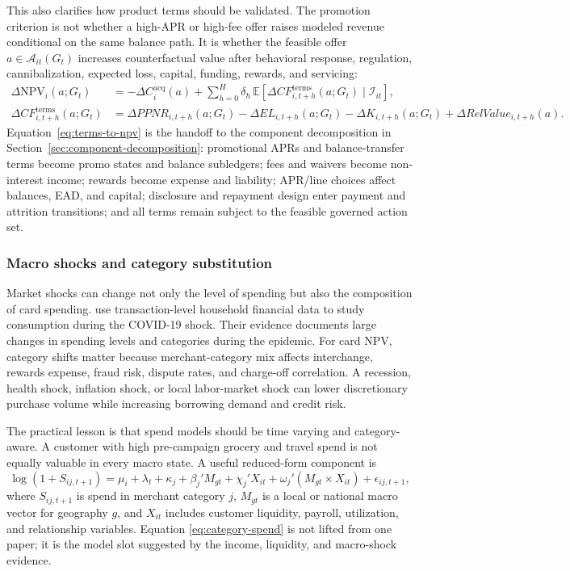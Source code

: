 \documentclass[11pt]{article}
\newcommand{\E}{\mathbb{E}}
\newcommand{\NPV}{\mathrm{NPV}}
\newcommand{\1}{\mathbf{1}}
\begin{document}
This also clarifies how product terms should be validated. The promotion
criterion is not whether a high-APR or high-fee offer raises modeled revenue
conditional on the same balance path. It is whether the feasible offer
$a\in\mathcal{A}_{it}(G_t)$ increases counterfactual value after behavioral
response, regulation, cannibalization, expected loss, capital, funding, rewards,
and servicing:
\begin{align}
  \Delta \NPV_i(a;G_t)
  &=
  -\Delta C_i^{\mathrm{acq}}(a)
  +
  \sum_{h=0}^{H}\delta_h\,
  \E\!\left[
    \Delta CF^{\mathrm{terms}}_{i,t+h}(a;G_t)
    \mid \mathcal{I}_{it}
  \right],
  \label{eq:terms-to-npv}\\
  \Delta CF^{\mathrm{terms}}_{i,t+h}(a;G_t)
  &=
  \Delta PPNR_{i,t+h}(a;G_t)
  - \Delta EL_{i,t+h}(a;G_t)
  - \Delta K_{i,t+h}(a;G_t)
  + \Delta RelValue_{i,t+h}(a).
\end{align}
Equation~\eqref{eq:terms-to-npv} is the handoff to the component decomposition
in Section~\ref{sec:component-decomposition}: promotional APRs and
balance-transfer terms become promo states and balance subledgers; fees and
waivers become non-interest income; rewards become expense and liability;
APR/line choices affect balances, EAD, and capital; disclosure and repayment
design enter payment and attrition transitions; and all terms remain subject to
the feasible governed action set.

\subsubsection{Macro shocks and category substitution}

Market shocks can change not only the level of spending but also the composition
of card spending. \citet{baker2020epidemic} use transaction-level household
financial data to study consumption during the COVID-19 shock. Their evidence
documents large changes in spending levels and categories during the epidemic.
For card NPV, category shifts matter because merchant-category mix affects
interchange, rewards expense, fraud risk, dispute rates, and charge-off
correlation. A recession, health shock, inflation shock, or local labor-market
shock can lower discretionary purchase volume while increasing borrowing demand
and credit risk.

The practical lesson is that spend models should be time varying and
category-aware. A customer with high pre-campaign grocery and travel spend is
not equally valuable in every macro state. A useful reduced-form component is
\begin{equation}
  \log(1+S_{ij,t+1})
  =
  \mu_i + \lambda_t + \kappa_j
  + \beta_j' M_{gt}
  + \chi_j' X_{it}
  + \omega_j' (M_{gt}\times X_{it})
  + \epsilon_{ij,t+1},
  \label{eq:category-spend}
\end{equation}
where $S_{ij,t+1}$ is spend in merchant category $j$, $M_{gt}$ is a local or
national macro vector for geography $g$, and $X_{it}$ includes customer
liquidity, payroll, utilization, and relationship variables. Equation
\eqref{eq:category-spend} is not lifted from one paper; it is the model slot
suggested by the income, liquidity, and macro-shock evidence.
\end{document}
